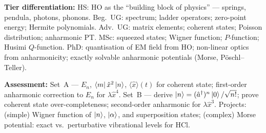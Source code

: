 \documentclass[11pt,a4paper]{article}
\begin{document}
\begin{tcolorbox}[modulebox, title={Module~I.4 / L03: The Harmonic Oscillator}]
\medskip\textbf{Tier differentiation:}
HS: HO as the ``building block of physics'' --- springs, pendula, photons, phonons.
Beg.\ UG: spectrum; ladder operators; zero-point energy; Hermite polynomials.
Adv.\ UG: matrix elements; coherent states; Poisson distribution; anharmonic PT.
MSc: squeezed states; Wigner function; $P$-function; Husimi $Q$-function.
PhD: quantisation of EM field from HO; non-linear optics from anharmonicity;
exactly solvable anharmonic potentials (Morse, P\"oschl--Teller).

\medskip\textbf{Assessment:}
Set~A --- $E_n$, $\bra{m}\hat{x}^2\ket{n}$, $\langle\hat{x}\rangle(t)$ for coherent state;
first-order anharmonic correction to $E_n$ for $\lambda\hat{x}^4$.
Set~B --- derive $\ket{n}=(\hat{a}^\dagger)^n\ket{0}/\sqrt{n!}$; prove coherent state over-completeness;
second-order anharmonic for $\lambda\hat{x}^3$.
Projects: (simple) Wigner function of $\ket{n}$, $\ket{\alpha}$, and superposition states;
(complex) Morse potential: exact vs.\ perturbative vibrational levels for HCl.
\end{tcolorbox}

\medskip
\end{document}

